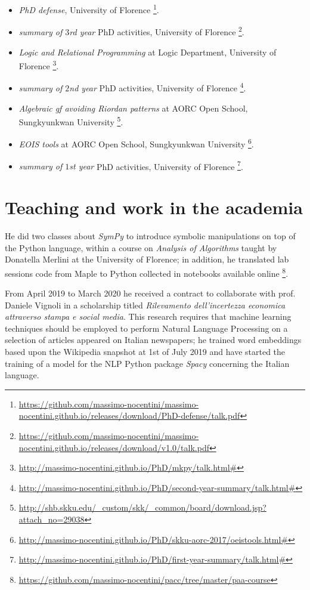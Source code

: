 \documentclass[a4paper]{article} %
\begin{document}
    \begin{itemize}
        \item \textit{PhD defense}, University of Florence \footnote{\url{https://github.com/massimo-nocentini/massimo-nocentini.github.io/releases/download/PhD-defense/talk.pdf}}.
        \item \textit{summary of $3$rd year} PhD activities, University of Florence \footnote{\url{https://github.com/massimo-nocentini/massimo-nocentini.github.io/releases/download/v1.0/talk.pdf}}.
        \item \textit{Logic and Relational Programming} at Logic Department, University of Florence \footnote{\url{http://massimo-nocentini.github.io/PhD/mkpy/talk.html\#}}.
        \item \textit{summary of $2$nd year} PhD activities, University of Florence \footnote{\url{http://massimo-nocentini.github.io/PhD/second-year-summary/talk.html\#}}.
        \item \textit{Algebraic gf avoiding Riordan patterns} at AORC Open School, Sungkyunkwan University \footnote{\url{http://shb.skku.edu/_custom/skk/_common/board/download.jsp?attach_no=29038}}.
        \item \textit{EOIS tools} at AORC Open School, Sungkyunkwan University \footnote{\url{http://massimo-nocentini.github.io/PhD/skku-aorc-2017/oeistools.html\#}}.
        \item \textit{summary of $1$st year} PhD activities, University of Florence \footnote{\url{http://massimo-nocentini.github.io/PhD/first-year-summary/talk.html\#}}.
    \end{itemize}

    \section{Teaching and work in the academia}

    He did two classes about \emph{SymPy} to introduce symbolic manipulations
    on top of the Python language, within a course on \emph{Analysis of
    Algorithms} taught by Donatella Merlini at the University of Florence; in
    addition, he translated lab sessions code from Maple to Python collected in
    notebooks available online
    \footnote{\url{https://github.com/massimo-nocentini/pacc/tree/master/paa-course}}.
	
	From April 2019 to March 2020 he received a contract to collaborate with prof.
	Daniele Vignoli in a scholarship titled \emph{Rilevamento dell’incertezza economica attraverso stampa e social media}. This research requires that machine learning techniques should be 
	employed to perform Natural Language Processing on a selection of articles appeared
	on Italian newspapers; he trained word embeddings based upon the Wikipedia snapshot
	at 1st of July 2019 and have started the training of a model for the NLP
	Python package \emph{Spacy} concerning the Italian language.
\end{document}
